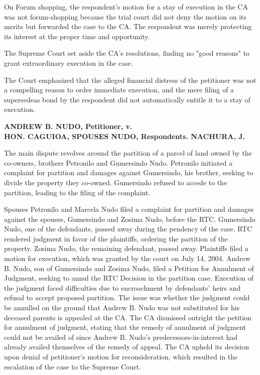 \documentclass[
12pt,
oneside,
onehalfspacing,
headsepline
]{DigestCollection}
\begin{document}
On Forum shopping, the respondent's motion for a stay of execution in the CA was not forum-shopping because the trial court did not deny the motion on its merits but forwarded the case to the CA. The respondent was merely protecting its interest at the proper time and opportunity.

The Supreme Court set aside the CA's resolutions, finding no "good reasons" to grant extraordinary execution in the case. 

The Court emphasized that the alleged financial distress of the petitioner was not a compelling reason to order immediate execution, and the mere filing of a supersedeas bond by the respondent did not automatically entitle it to a stay of execution.

\label{e3e12ce0-0a19-11ef-932c-63c852f65e48}


\noindent\textbf{ANDREW B. NUDO, Petitioner, v. \\HON. CAGUIOA, SPOUSES NUDO, Respondents. NACHURA, J.}\vspace{0.4cm}

The main dispute revolves around the partition of a parcel of land owned by the co-owners, brothers Petronilo and Gumersindo Nudo. Petronilo initiated a complaint for partition and damages against Gumersindo, his brother, seeking to divide the property they co-owned. Gumersindo refused to accede to the partition, leading to the filing of the complaint.

Spouses Petronilo and Marcela Nudo filed a complaint for partition and damages against the spouses, Gumersindo and Zosima Nudo, before the RTC. Gumersindo Nudo, one of the defendants, passed away during the pendency of the case. RTC rendered judgment in favor of the plaintiffs, ordering the partition of the property. Zosima Nudo, the remaining defendant, passed away. Plaintiffs filed a motion for execution, which was granted by the court on July 14, 2004. Andrew B. Nudo, son of Gumersindo and Zosima Nudo, filed a Petition for Annulment of Judgment, seeking to annul the RTC Decision in the partition case. Execution of the judgment faced difficulties due to encroachment by defendants' heirs and refusal to accept proposed partition. The issue was whether the judgment could be annulled on the ground that Andrew B. Nudo was not substituted for his deceased parents is appealed at the CA. The CA dismissed outright the petition for annulment of judgment, stating that the remedy of annulment of judgment could not be availed of since Andrew B. Nudo's predecessors-in-interest had already availed themselves of the remedy of appeal. The CA upheld its decision upon denial of petitioner's motion for reconsideration, which resulted in the escalation of the case to the Supreme Court.
\end{document}
